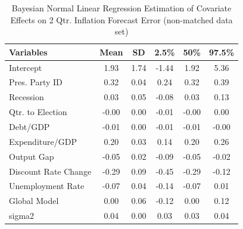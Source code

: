\documentclass[a4paper]{article}\usepackage{graphicx, color}
\begin{document}
\begin{table}[ht]
\begin{center}
\caption{Bayesian Normal Linear Regression Estimation of Covariate Effects on 2 Qtr. Inflation Forecast Error (non-matched data set)}
\label{OutputNB}
{\small
\begin{tabular}{lccccc}
  \hline
Variables & Mean & SD & 2.5\% & 50\% & 97.5\% \\ 
  \hline
Intercept & 1.93 & 1.74 & -1.44 & 1.92 & 5.36 \\ 
  Pres. Party ID & 0.32 & 0.04 & 0.24 & 0.32 & 0.39 \\ 
  Recession & 0.03 & 0.05 & -0.08 & 0.03 & 0.13 \\ 
  Qtr. to Election & -0.00 & 0.00 & -0.01 & -0.00 & 0.00 \\ 
  Debt/GDP & -0.01 & 0.00 & -0.01 & -0.01 & -0.00 \\ 
  Expenditure/GDP & 0.20 & 0.03 & 0.14 & 0.20 & 0.26 \\ 
  Output Gap & -0.05 & 0.02 & -0.09 & -0.05 & -0.02 \\ 
  Discount Rate Change & -0.29 & 0.09 & -0.45 & -0.29 & -0.12 \\ 
  Unemployment Rate & -0.07 & 0.04 & -0.14 & -0.07 & 0.01 \\ 
  Global Model & 0.00 & 0.06 & -0.12 & 0.00 & 0.12 \\ 
  sigma2 & 0.04 & 0.00 & 0.03 & 0.03 & 0.04 \\ 
   \hline
\end{tabular}
}
\end{center}
\end{table}




\end{document}
